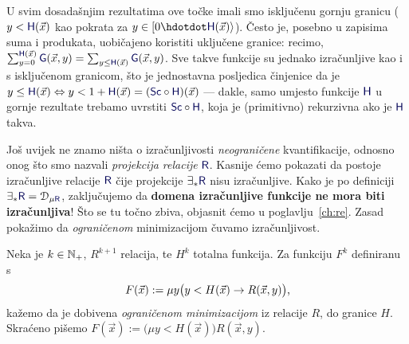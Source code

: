 \begin{napomena}[{name=[granice mogu biti i uključene]}]\label{nap:kvantSc}
U svim dosadašnjim rezultatima ove točke imali smo isključenu gornju granicu ($y<\f H(\vec x)$ kao pokrata za $y\in[0\dd \f H(\vec x)\rangle$). Često je, posebno u zapisima suma i produkata, uobičajeno koristiti uključene granice: recimo, $\sum_{y=0}^{\f H(\vec x)}\f G(\vec x,y)=\sum_{y\le\f H(\vec x)}\f G(\vec x,y)$. Sve takve funkcije su jednako izračunljive kao i s isključenom granicom, što je jednostavna posljedica činjenice da je $y\le\f H(\vec x)\Leftrightarrow y<1+\f H(\vec x)=(\f{Sc}\circ\f H)(\vec x)$ --- dakle, samo umjesto funkcije $\f H$ u gornje rezultate trebamo uvrstiti $\f{Sc}\circ\f H$, koja je (primitivno) rekurzivna ako je $\f H$ takva.
%
\end{napomena}

Još uvijek ne znamo ništa o izračunljivosti \emph{neograničene} kvantifikacije, odnosno onog što smo nazvali \emph{projekcija relacije} $\f R$. Kasnije ćemo pokazati da postoje izračunljive relacije $\f R$ čije projekcije $\exists_*\f R$ nisu izračunljive. Kako je po definiciji $\exists_*\f R=\dom{\mu\f R}$, zaključujemo da \textbf{domena izračunljive funkcije ne mora biti izračunljiva}! Što se tu točno zbiva, objasnit ćemo u poglavlju~\ref{ch:re}. Zasad pokažimo da \emph{ograničenom} minimizacijom čuvamo izračunljivost.


\begin{definicija}[{name=[ograničena minimizacija]}]
Neka je $k\in{\mathbb N}_+$, $R^{k+1}$ relacija, te $H^k$ totalna funkcija. Za funkciju $F^k$ definiranu s
\begin{equation}
    F(\vec x):=\mu y\bigl(y<H(\vec x)\to R(\vec x,y)\bigr)\text,
\end{equation}
kažemo da je dobivena \emph{ograničenom minimizacijom} iz relacije $R$, do granice $H$. Skraćeno pišemo $F(\vec x):=\bigl(\mu y<H(\vec x)\bigr)R(\vec x,y)$.
\end{definicija}

